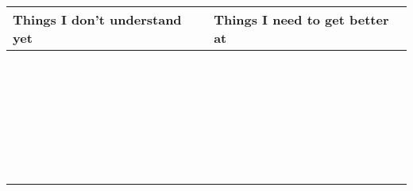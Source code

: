 \documentclass[a4paper]{article}
\theoremstyle{definition}
\begin{document}
\begin{center}
\hspace{-2em}\begin{tabular}{l|l}
  \textbf{Things I don't understand yet} &
   \textbf{Things I need to get better at} \\ \hline
  & \\
  & \\
                                         & \\
                                         & \\
                                         & \\
                                         & \\
                                         & \\
                                         & \\
                                         & \\
                                         & \\
                                         & \\
                                         & \\
                                         & \\
                                         & \\
                                         & \\
                                         & \\
                                         & \\
                                         & \\
                                         & \\
                                         & \\
                                         & \\
                                         & \\
                                         & \\
                                         & \\
                                         & \\
                                         & \\
                                         & \\
                                         & \\

\end{tabular}
\end{center}
\end{document}
